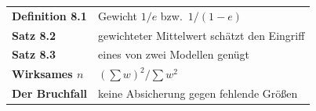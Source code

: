 \begin{merksatz}
\begin{center}
\renewcommand{\arraystretch}{1.5}
\begin{tabular}{@{}P{3.0cm}P{5.6cm}@{}}
\toprule
\textbf{Definition 8.1} & Gewicht $1/e$ bzw.\ $1/(1-e)$\\
\textbf{Satz 8.2} & gewichteter Mittelwert schätzt den Eingriff\\
\textbf{Satz 8.3} & eines von zwei Modellen genügt\\
\textbf{Wirksames $n$} & $(\sum w)^{2}/\sum w^{2}$\\
\textbf{Der Bruchfall} & keine Absicherung gegen fehlende Größen\\
\bottomrule
\end{tabular}
\end{center}

\begin{center}
\begin{minipage}{0.88\textwidth}
\end{minipage}
\end{center}
\end{merksatz}
